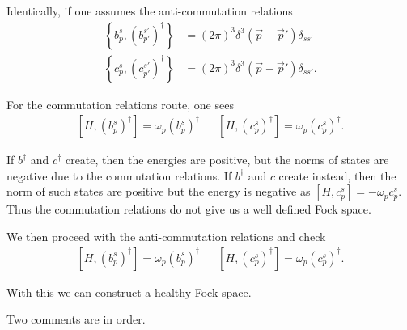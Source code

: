 Identically, if one assumes the anti-commutation relations
\begin{align}
    \left\{ b_p^{s}, \left( b^{s'}_{p'} \right)^{\dag} \right\} &= \left( 2\pi \right)^3 \delta^{3} \left( \vec{p} - \vec{p}' \right) \delta_{s s'} \\
    \left\{ c_p^{s}, \left( c^{s'}_{p'} \right)^{\dag} \right\} &= \left( 2\pi \right)^3 \delta^{3} \left( \vec{p} - \vec{p}' \right) \delta_{s s'} 
.\end{align}

For the commutation relations route, one sees
\begin{align}
    \left[ H, \left( b_p^{s} \right)^{\dag} \right]  = \omega_p \left( b_p^{s} \right)^{\dag} && \left[ H, \left( c_p^{s} \right)^{\dag} \right] = \omega_p \left( c_p^{s} \right) ^{\dag}
.\end{align}

If $b^{\dag}$ and $c^{\dag}$ create, then the energies are positive, but the norms of states are negative due to the commutation relations. If $b^{\dag}$ and $c$ create instead, then the norm of such states are positive but the energy is negative as $\left[ H, c_p^{s} \right] = - \omega_p c_p^{s}$. Thus the commutation relations do not give us a well defined Fock space.

We then proceed with the anti-commutation relations and check
\begin{align}
    \left[ H, \left( b^{s}_p \right)^{\dag}  \right] = \omega_p \left( b^{s}_p \right)^{\dag} && \left[ H, \left( c^{s}_p \right)^{\dag} \right] = \omega_p \left( c^{s}_p \right)^{\dag}
.\end{align}

With this we can construct a healthy Fock space.

Two comments are in order.


